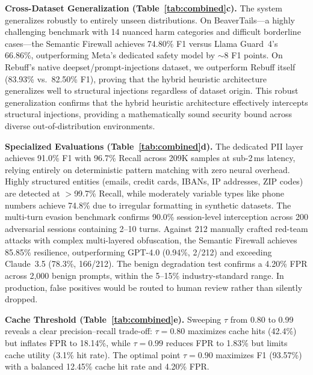 \documentclass[conference]{IEEEtran}
\begin{document}
\textbf{Cross-Dataset Generalization (Table~\ref{tab:combined}c).}
The system generalizes robustly to entirely unseen distributions. On
BeaverTails---a highly challenging benchmark with 14 nuanced harm
categories and difficult borderline cases---the Semantic Firewall
achieves 74.80\% F1 versus Llama Guard~4's 66.86\%, outperforming
Meta's dedicated safety model by $\sim$8 F1 points. On Rebuff's
native deepset/prompt-injections dataset, we outperform Rebuff
itself (83.93\% vs.\ 82.50\% F1), proving that the hybrid heuristic
architecture generalizes well to structural injections regardless of
dataset origin. This robust generalization confirms that the hybrid heuristic
architecture effectively intercepts structural injections,
providing a mathematically sound security bound across diverse out-of-distribution environments.

\textbf{Specialized Evaluations (Table~\ref{tab:combined}d).} The
dedicated PII layer achieves 91.0\% F1 with 96.7\% Recall across
209K samples at sub-2\,ms latency, relying entirely on deterministic
pattern matching with zero neural overhead. Highly structured entities (emails,
credit cards, IBANs, IP addresses, ZIP codes) are detected at
$>$99.7\% Recall, while moderately variable types like phone numbers
achieve 74.8\% due to irregular formatting in synthetic datasets.
The multi-turn evasion benchmark confirms 90.0\% session-level
interception across 200 adversarial sessions containing 2--10 turns.
Against 212 manually crafted red-team attacks with complex
multi-layered obfuscation, the Semantic Firewall achieves 85.85\%
resilience, outperforming GPT-4.0 (0.94\%, 2/212) and
exceeding Claude~3.5 (78.3\%, 166/212). The benign degradation
test confirms a 4.20\% FPR across 2{,}000 benign prompts, within
the 5--15\% industry-standard range. In production, false positives
would be routed to human review rather than silently dropped.

\textbf{Cache Threshold (Table~\ref{tab:combined}e).} Sweeping
$\tau$ from 0.80 to 0.99 reveals a clear precision--recall
trade-off: $\tau{=}0.80$ maximizes cache hits (42.4\%) but inflates
FPR to 18.14\%, while $\tau{=}0.99$ reduces FPR to 1.83\% but
limits cache utility (3.1\% hit rate). The optimal point
$\tau{=}0.90$ maximizes F1 (93.57\%) with a balanced 12.45\% cache
hit rate and 4.20\% FPR.
\end{document}
